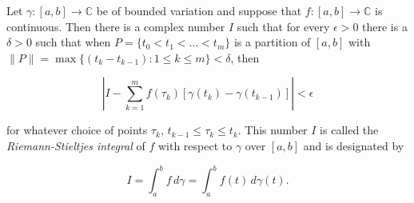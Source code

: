 Let $\gamma: [a, b] \to \mathbb{C}$ be of bounded variation and suppose that $f: [a, b] \to \mathbb{C}$ is continuous. Then there is a complex number $I$ such that for every $\epsilon > 0$ there is a $\delta > 0$ such that when $P = \{t_0 < t_1 < \ldots < t_m\}$ is a partition of $[a, b]$ with $\|P\| = \max \{(t_k - t_{k-1}): 1 \leq k \leq m\} < \delta$, then

$$\left| I - \sum_{k=1}^{m} f(\tau_k) [\gamma(t_k) - \gamma(t_{k-1})] \right| < \epsilon$$

for whatever choice of points $\tau_k$, $t_{k-1} \leq \tau_k \leq t_k$. This number $I$ is called the \textit{Riemann-Stieltjes integral} of $f$ with respect to $\gamma$ over $[a, b]$ and is designated by

$$I = \int_{a}^{b} f \, d\gamma = \int_{a}^{b} f(t) \, d\gamma(t).$$
